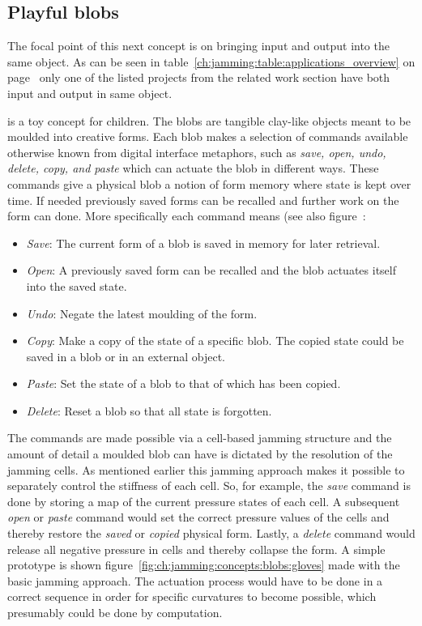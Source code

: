 \subsection{Playful blobs}
\label{ch:jamming:concepts:playful_blobs}

The focal point of this next concept is on bringing input and output into the same object.
As can be seen in table~\ref{ch:jamming:table:applications_overview} on page~\pageref{ch:jamming:table:applications_overview} only one of the listed projects from the related work section have both input and output in same object. 

 is a toy concept for children.
The blobs are tangible clay-like objects meant to be moulded into creative forms.
Each blob makes a selection of commands available otherwise known from digital interface metaphors, such as \emph{save, open, undo, delete, copy, and paste} which can actuate the blob in different ways.
These commands give a physical blob a notion of form memory where state is kept over time.
If needed previously saved forms can be recalled and further work on the form can done.
More specifically each command means (see also figure~:
\begin{itemize}
	\item{\emph{Save}: The current form of a blob is saved in memory for later retrieval.}
	\item{\emph{Open}: A previously saved form can be recalled and the blob actuates itself into the saved state.}
	\item{\emph{Undo}: Negate the latest moulding of the form.}
	\item{\emph{Copy}: Make a copy of the state of a specific blob. The copied state could be saved in a blob or in an external object.}
	\item{\emph{Paste}: Set the state of a blob to that of which has been copied.} 
	\item{\emph{Delete}: Reset a blob so that all state is forgotten.} 
\end{itemize}
The commands are made possible via a cell-based jamming structure and the amount of detail a moulded blob can have is dictated by the resolution of the jamming cells.
As mentioned earlier this jamming approach makes it possible to separately control the stiffness of each cell.
So, for example, the \emph{save} command is done by storing a map of the current pressure states of each cell.
A subsequent \emph{open} or \emph{paste} command would set the correct pressure values of the cells and thereby restore the \emph{saved} or \emph{copied} physical form.
Lastly, a \emph{delete} command would release all negative pressure in cells and thereby collapse the form.
A simple prototype is shown figure~\ref{fig:ch:jamming:concepts:blobs:gloves} made with the basic jamming approach.
The actuation process would have to be done in a correct sequence in order for specific curvatures to become possible, which presumably could be done by computation.

